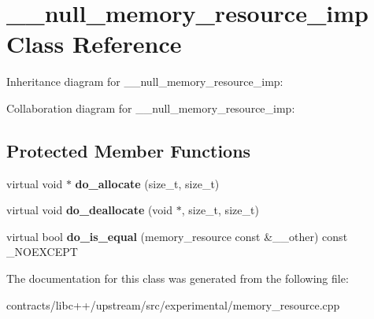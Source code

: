 \hypertarget{class____null__memory__resource__imp}{}\section{\+\_\+\+\_\+null\+\_\+memory\+\_\+resource\+\_\+imp Class Reference}
\label{class____null__memory__resource__imp}


Inheritance diagram for \+\_\+\+\_\+null\+\_\+memory\+\_\+resource\+\_\+imp\+:


Collaboration diagram for \+\_\+\+\_\+null\+\_\+memory\+\_\+resource\+\_\+imp\+:
\subsection*{Protected Member Functions}
\begin{DoxyCompactItemize}
\item 
\mbox{\label{class____null__memory__resource__imp_a1025eb66693c340f7a66d36164bd596d}} 
virtual void $\ast$ {\bfseries do\+\_\+allocate} (size\+\_\+t, size\+\_\+t)
\item 
\mbox{\label{class____null__memory__resource__imp_ae2ef5210829a53d0a083b198b02494ba}} 
virtual void {\bfseries do\+\_\+deallocate} (void $\ast$, size\+\_\+t, size\+\_\+t)
\item 
\mbox{\label{class____null__memory__resource__imp_aa955947f4f31bd4980a27af7962a59bd}} 
virtual bool {\bfseries do\+\_\+is\+\_\+equal} (memory\+\_\+resource const \&\+\_\+\+\_\+other) const \+\_\+\+N\+O\+E\+X\+C\+E\+PT
\end{DoxyCompactItemize}


The documentation for this class was generated from the following file\+:\begin{DoxyCompactItemize}
\item 
contracts/libc++/upstream/src/experimental/memory\+\_\+resource.\+cpp\end{DoxyCompactItemize}
